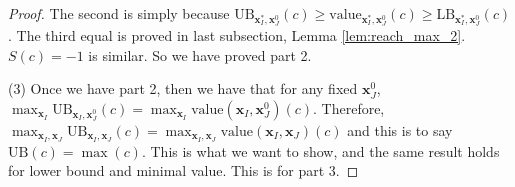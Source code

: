 \documentclass[]{article}
\newtheorem{lemma}{Lemma}
\theoremstyle{definition}
\newcommand{\Val}{\mathrm{value}}
\newcommand{\UB}{\mathrm{UB}}
\newcommand{\LB}{\mathrm{LB}}
\begin{document}
\begin{proof}
	The second is simply because $\UB_{\boldsymbol{x}^*_I,\boldsymbol{x}^0_J}(c)\geq \Val_{\boldsymbol{x}^*_I,\boldsymbol{x}^0_J}(c)\geq\LB_{\boldsymbol{x}^*_I,\boldsymbol{x}^0_J}(c)$.	The third equal is proved in last subsection, Lemma \ref{lem:reach_max_2}. $S(c)=-1$ is similar. So we have proved part 2.
	
	(3) Once we have part 2, then we have that for any fixed $\boldsymbol{x}^0_J$, $\max_{\boldsymbol{x}_I} \UB_{\boldsymbol{x}_I,\boldsymbol{x}^0_J}(c)= \max_{\boldsymbol{x}_I} \Val(\boldsymbol{x}_I,\boldsymbol{x}^0_J)(c)$. Therefore, $\max_{\boldsymbol{x}_I,\boldsymbol{x}_J} \UB_{\boldsymbol{x}_I,\boldsymbol{x}_J}(c)= \max_{\boldsymbol{x}_I,\boldsymbol{x}_J} \Val(\boldsymbol{x}_I,\boldsymbol{x}_J)(c)$ and this is to say $\UB(c)=\max(c)$. This is what we want to show, and the same result holds for lower bound and minimal value. This is for part 3.
	
	
	

\end{proof}



%	
%	
\end{document}
